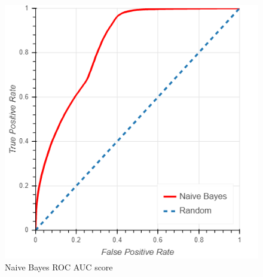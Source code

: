\documentclass[10pt, conference, compsocconf]{IEEEtran}
\begin{document}
\begin{figure}
  \includegraphics[scale=0.45]{naive_bayes_roc}
  \centering
  \caption{Naive Bayes ROC AUC score}
  \label{fig:naive_bayes_roc}
\end{figure}
%
%

\end{document}
